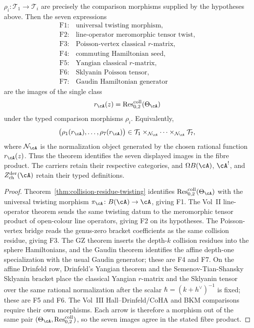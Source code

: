 \begin{theorem}
$\rho_i:\mathcal T_1\to\mathcal T_i$ are precisely the comparison
morphisms supplied by the hypotheses above.
Then the seven expressions
\[
\begin{array}{ll}
\mathrm{F1}:&\text{universal twisting morphism,}\\
\mathrm{F2}:&\text{line-operator meromorphic tensor twist,}\\
\mathrm{F3}:&\text{Poisson-vertex classical }r\text{-matrix,}\\
\mathrm{F4}:&\text{commuting Hamiltonian seed,}\\
\mathrm{F5}:&\text{Yangian classical }r\text{-matrix,}\\
\mathrm{F6}:&\text{Sklyanin Poisson tensor,}\\
\mathrm{F7}:&\text{Gaudin Hamiltonian generator}
\end{array}
\]
are the images of the single class
\[
r_\cA(z)=\operatorname{Res}^{\mathrm{coll}}_{0,2}(\Theta_\cA)
\]
under the typed comparison morphisms $\rho_i$.  Equivalently,
\[
\bigl(\rho_1(r_\cA),\ldots,\rho_7(r_\cA)\bigr)
\in
\mathcal T_1\times_{\mathcal N_\cA}\cdots
\times_{\mathcal N_\cA}\mathcal T_7,
\]
where $\mathcal N_\cA$ is the normalization object generated by the
chosen rational function $r_\cA(z)$.  Thus the theorem identifies the
seven displayed images in the fibre product.  The carriers retain
their respective categories, and $\Omega B(\cA)$, $\cA^!$, and
$Z^{\mathrm{der}}_{\mathrm{ch}}(\cA)$ retain their typed definitions.
\end{theorem}

\begin{proof}
Theorem~\ref{thm:collision-residue-twisting} identifies
$\operatorname{Res}^{\mathrm{coll}}_{0,2}(\Theta_\cA)$ with the
universal twisting morphism
$\pi_\cA\colon B(\cA)\to\cA$, giving F1.  The Vol~II line-operator
theorem sends the same twisting datum to the meromorphic tensor
product of open-colour line operators, giving F2 on its hypotheses.
The Poisson-vertex bridge reads the genus-zero bracket coefficients
as the same collision residue, giving F3.  The GZ theorem inserts
the depth-$k$ collision residues into the sphere Hamiltonians, and
the Gaudin theorem identifies the affine depth-one specialization
with the usual Gaudin generator; these are F4 and F7.  On the affine
Drinfeld row, Drinfeld's Yangian theorem and the
Semenov-Tian-Shansky Sklyanin bracket place the classical Yangian
$r$-matrix and the Sklyanin tensor over the same rational
normalization after the scalar $\hbar=(k+h^\vee)^{-1}$ is fixed; these
are F5 and F6.  The Vol~III Hall--Drinfeld/CoHA and BKM comparisons
require their own morphisms.  Each arrow is therefore a morphism out of the same
pair
$(\Theta_\cA,\operatorname{Res}^{\mathrm{coll}}_{0,2})$, so the
seven images agree in the stated fibre product.
\end{proof}

